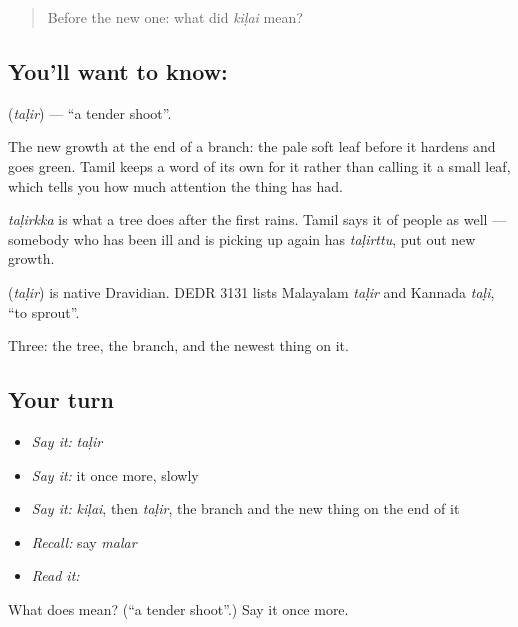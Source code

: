 \label{lesson:TA-C52-shoot}



\begin{quote}
Before the new one: what did \emph{kiḷai} mean?
\end{quote}

\subsection*{You'll want to know: }
\textbf{} (\emph{taḷir}) — \textquotedblleft{}a tender shoot\textquotedblright{}.

The new growth at the end of a branch: the pale soft leaf before it hardens and goes green. Tamil keeps a word of its own for it rather than calling it a small leaf, which tells you how much attention the thing has had.

\emph{taḷirkka} is what a tree does after the first rains. Tamil says it of people as well — somebody who has been ill and is picking up again has \emph{taḷirttu}, put out new growth.

\begin{cousinweb}
\textbf{} (\emph{taḷir}) is native Dravidian. DEDR 3131 lists Malayalam \emph{taḷir} and Kannada \emph{taḷi}, \textquotedblleft{}to sprout\textquotedblright{}.
\end{cousinweb}

\begin{grammarlens}[title={What you've built}]
Three: the tree, the branch, and the newest thing on it.
\end{grammarlens}

\subsection*{Your turn}
\begin{itemize}
\raggedright
  \item \emph{Say it:} \emph{taḷir}
  \item \emph{Say it:} it once more, slowly
  \item \emph{Say it:} \emph{kiḷai}, then \emph{taḷir}, the branch and the new thing on the end of it
  \item \emph{Recall:} say \emph{malar}
  \item \emph{Read it:} \textbf{}
\end{itemize}

\begin{tcolorbox}[breakable,colback=teal!4,colframe=teal!35!black,title={Before you move on}]
What does  mean? (\textquotedblleft{}a tender shoot\textquotedblright{}.) Say it once more.
\end{tcolorbox}

